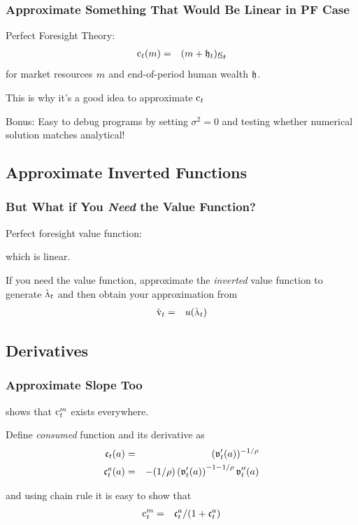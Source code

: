 \documentclass{beamer}
\begin{document}
\begin{frame}
\frametitle{Approximate Something That Would Be Linear in PF Case}

\medskip

Perfect Foresight Theory:
\begin{eqnarray}
  \cFunc_{t}(\mRat) & = & (\mRat+\hEnd_{t})\MinMPC_{t} 
\end{eqnarray}
for market resources $m$ and end-of-period human wealth $\mathfrak{h}$.


\medskip\medskip
\pause 

This is why it's a good idea to approximate $\mathrm{c}_{t}$ 

\pause \medskip\medskip

Bonus: Easy to debug programs by setting $\sigma^{2} = 0$ and
testing whether numerical solution matches analytical!

\end{frame}

\subsection{Approximate Inverted Functions}
\begin{frame}%
\frametitle{But What if You {\it Need} the Value Function?}

Perfect foresight value function:

which is linear.  

\medskip\medskip
\pause If you need the value function, approximate the {\it inverted} value function to generate $\grave{\scriptstyle \Lambda \displaystyle}_{t}$ 
and then obtain your approximation from 
\begin{eqnarray}
  \grave{\mathrm{v}}_{t} & = & u(\grave{\scriptstyle \Lambda \displaystyle}_{t})
\end{eqnarray}


\end{frame}

\subsection{Derivatives}
\begin{frame}
\frametitle{Approximate Slope Too}

\cite{BufferStockTheory} shows that $\mathrm{c}^{m}_{t}$ exists everywhere.
\medskip

\pause 
Define {\it consumed} function and its derivative as 
\begin{eqnarray}
  \mathfrak{c}_{t}(a) & = & (\mathfrak{v}^{\prime}_{t}(a))^{-1/\rho}
\\ \mathfrak{c}_{t}^{a}(a) & = & -(1/\rho)\left(\mathfrak{v}_{t}^{\prime}({a})\right)^{-1-1/\rho} \mathfrak{v}_{t}^{\prime\prime}(a) 
\end{eqnarray}

\pause 
and using chain rule it is easy to show that
\begin{eqnarray}
 \mathrm{c}^{m}_{t} & = & \mathfrak{c}^{a}_{t}/(1+\mathfrak{c}^{a}_{t})
\end{eqnarray}

\end{frame}
\end{document}
